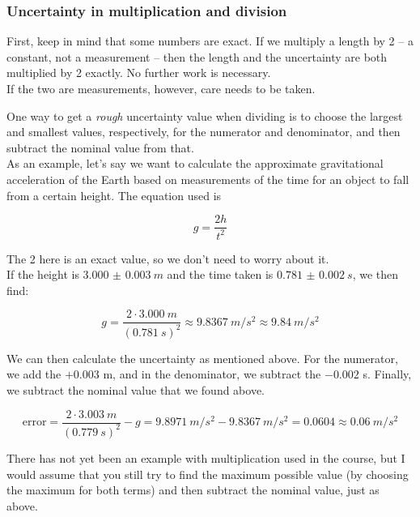 \documentclass[8.01x]{subfiles}
\begin{document}
\subsubsection{Uncertainty in multiplication and division}

First, keep in mind that some numbers are exact. If we multiply a length by 2 -- a constant, not a measurement -- then the length and the uncertainty are both multiplied by 2 exactly. No further work is necessary.\\
If the two are measurements, however, care needs to be taken.

One way to get a \emph{rough} uncertainty value when dividing is to choose the largest and smallest values, respectively, for the numerator and denominator, and then subtract the nominal value from that.\\
As an example, let's say we want to calculate the approximate gravitational acceleration of the Earth based on measurements of the time for an object to fall from a certain height. The equation used is

\begin{equation}
 g = \frac{2 h}{t^2}
\end{equation}

The 2 here is an exact value, so we don't need to worry about it.\\
If the height is $\SI{3.000(3)}{m}$ and the time taken is $\SI{0.781(2)}{s}$, we then find:

\begin{equation}
g = \frac{2\cdot\SI{3.000}{m}}{(\SI{0.781}{s})^2} \approx \SI{9.8367}{m/s^2} \approx \SI{9.84}{m/s^2}
\end{equation}

We can then calculate the uncertainty as mentioned above. For the numerator, we add the $+ 0.003$ m, and in the denominator, we subtract the $- 0.002$ s. Finally, we subtract the nominal value that we found above.

\begin{equation}
\text{error} = \frac{2 \cdot \SI{3.003}{m}}{(\SI{0.779}{s})^2} - g = \SI{9.8971}{m/s^2} - \SI{9.8367}{m/s^2} = 0.0604 \approx \SI{0.06}{m/s^2}
\end{equation}

There has not yet been an example with multiplication used in the course, but I would assume that you still try to find the maximum possible value (by choosing the maximum for both terms) and then subtract the nominal value, just as above.
\end{document}
